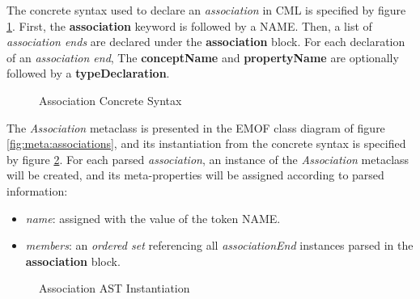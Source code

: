 The concrete syntax used to declare an \emph{association} in CML
is specified by figure \ref{fig:stx:association}.
First, the \textbf{association} keyword is followed by a NAME.
Then, a list of \emph{association ends} are declared under the \textbf{association} block.
For each declaration of an \emph{association end},
The \textbf{conceptName} and \textbf{propertyName} are optionally followed by a \textbf{typeDeclaration}.

\begin{figure}
\verbatimfont{\small}

\caption{Association Concrete Syntax}
\label{fig:stx:association}
\end{figure}

The \emph{Association} metaclass is presented 
in the EMOF \cite{mof} class diagram of figure \ref{fig:meta:associations},
and its instantiation from the concrete syntax is specified by figure \ref{fig:ast:associations}.
For each parsed \emph{association},
an instance of the \emph{Association} metaclass will be created,
and its meta-properties will be assigned
according to parsed information:

\begin{itemize}

\item \emph{name}:
assigned with the value of the token NAME.

\item \emph{members}:
an \emph{ordered set} referencing all \emph{associationEnd}
instances parsed in the \textbf{association} block.

\end{itemize}

\begin{figure}
\verbatimfont{\small}

\caption{Association AST Instantiation}
\label{fig:ast:associations}
\end{figure}
